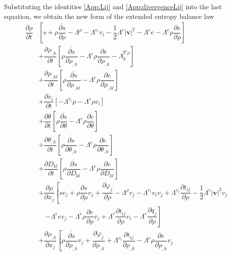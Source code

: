 \documentclass[a4paper,fleqn]{cas-sc}
\theoremstyle{definition}
\begin{document}
Substituting the identities \eqref{App:Lij} and \eqref{App:divergenceLij} into the last equation, we obtain the new form of the extended entropy balance law
\begin{align} \label{rezidualna nejednakost Kortevegovi fluidi}
	\dfrac{\partial\rho}{\partial t} & \left[s+\rho\overline{\dfrac{\partial s}{\partial\rho}}-\Lambda^\rho-\Lambda^{v_i}v_i-\dfrac{1}{2}\Lambda^e|\mathbf{v}|^2-\Lambda^ e e-\Lambda^e\rho\dfrac{\partial e}{\partial\rho}\right] 
	\nonumber \\
	& + \dfrac{\partial\rho_{,k}}{\partial t}\left[\rho\overline{\dfrac{\partial s}{\partial\rho_{,k}}}-\Lambda^e\rho\dfrac{\partial e}{\partial\rho_{,k}}-\Lambda^{\nabla\rho}_k\right] 
	\nonumber \\ 
	& +\dfrac{\partial\rho_{,kl}}{\partial t}\left[\rho\overline{\dfrac{\partial s}{\partial\rho_{,kl}}}-\Lambda^e\rho\dfrac{\partial e}{\partial\rho_{,kl}}\right] 
	\nonumber \\
	&+\dfrac{\partial v_i}{\partial t}\left[-\Lambda^{v_i}\rho-\Lambda^e\rho v_i\right] 
	\nonumber \\
	&+\dfrac{\partial\theta}{\partial t}\left[\rho\overline{\dfrac{\partial s}{\partial\theta}}-\Lambda^e\rho\dfrac{\partial e}{\partial\theta}\right] 
	\nonumber \\ 
	& +\dfrac{\partial\theta_{,k}}{\partial t}\left[\rho\overline{\dfrac{\partial s}{\partial\theta_{,k}}}-\Lambda^e\rho\dfrac{\partial e}{\partial\theta_{,k}}\right] 
	\\
	&+\dfrac{\partial D_{kl}}{\partial t}\left[\rho\overline{\dfrac{\partial s}{\partial D_{kl}}}-\Lambda^e\rho\dfrac{\partial e}{\partial D_{kl}}\right] 
	\nonumber \\
	& +\dfrac{\partial\rho}{\partial x_j}\left[sv_j+\rho\overline{\dfrac{\partial s}{\partial\rho}}v_j+\dfrac{\partial\varphi_j}{\partial\rho}-\Lambda^\rho v_j-\Lambda^{v_i}v_iv_j+\Lambda^{v_i}\dfrac{\partial t_{ij}}{\partial\rho}
	-\dfrac{1}{2}\Lambda^e|\mathbf{v}|^2v_j \right. 
	\nonumber \\ 
	& \quad \left. %
	-\Lambda^e e v_j-\Lambda^e \rho\dfrac{\partial e}{\partial\rho}v_j+\Lambda^e\dfrac{\partial t_{ij}}{\partial\rho}v_i-\Lambda^e\dfrac{\partial q_j}{\partial\rho}\right]
	\nonumber \\
	&+\dfrac{\partial\rho_{,k}}{\partial x_j}\left[\rho\overline{\dfrac{\partial s}{\partial\rho_{,k}}}v_j+\dfrac{\partial\varphi_j}{\partial\rho_{,k}}+\Lambda^{v_i}\dfrac{\partial t_{ij}}{\partial\rho_{,k}}-\Lambda^e\rho\dfrac{\partial e}{\partial\rho_{,k}}v_j %

\end{align}
\end{document}
